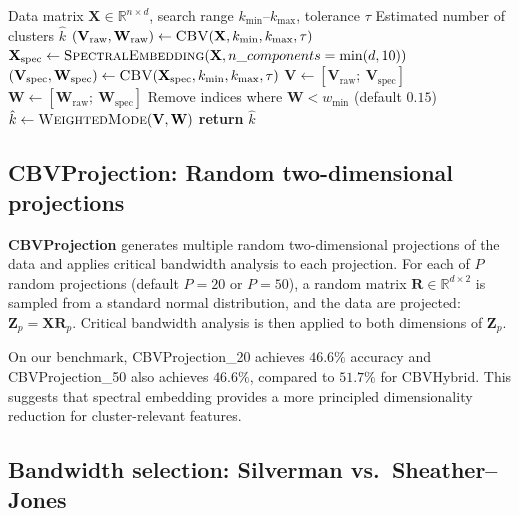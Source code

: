\documentclass[journal]{IEEEtran}
\begin{document}
\begin{algorithm}[t]
\caption{CBVHybrid Index}
\label{alg:cbvhybrid}
\begin{algorithmic}[1]
\Require Data matrix $\mathbf{X} \in \mathbb{R}^{n \times d}$, search range $k_{\min}$--$k_{\max}$, tolerance $\tau$
\Ensure Estimated number of clusters $\hat{k}$
\State $(\mathbf{V}_{\mathrm{raw}}, \mathbf{W}_{\mathrm{raw}}) \gets \textsc{CBV}(\mathbf{X}, k_{\min}, k_{\max}, \tau)$
\State $\mathbf{X}_{\mathrm{spec}} \gets \textsc{SpectralEmbedding}(\mathbf{X}, n\_components = \min(d, 10))$
\State $(\mathbf{V}_{\mathrm{spec}}, \mathbf{W}_{\mathrm{spec}}) \gets \textsc{CBV}(\mathbf{X}_{\mathrm{spec}}, k_{\min}, k_{\max}, \tau)$
\State $\mathbf{V} \gets [\mathbf{V}_{\mathrm{raw}};\ \mathbf{V}_{\mathrm{spec}}]$
\State $\mathbf{W} \gets [\mathbf{W}_{\mathrm{raw}};\ \mathbf{W}_{\mathrm{spec}}]$
\State Remove indices where $\mathbf{W} < w_{\min}$ (default $0.15$)
\State $\hat{k} \gets \textsc{WeightedMode}(\mathbf{V}, \mathbf{W})$
\State \textbf{return} $\hat{k}$
\end{algorithmic}
\end{algorithm}

\subsection{CBVProjection: Random two-dimensional projections}
\label{sec:cbvprojection}

\textbf{CBVProjection} generates multiple random two-dimensional projections of the data and applies critical bandwidth analysis to each projection. For each of $P$ random projections (default $P = 20$ or $P = 50$), a random matrix $\mathbf{R} \in \mathbb{R}^{d \times 2}$ is sampled from a standard normal distribution, and the data are projected: $\mathbf{Z}_p = \mathbf{X} \mathbf{R}_p$. Critical bandwidth analysis is then applied to both dimensions of $\mathbf{Z}_p$.

On our benchmark, CBVProjection\_20 achieves $46.6\%$ accuracy and CBVProjection\_50 also achieves $46.6\%$, compared to $51.7\%$ for CBVHybrid. This suggests that spectral embedding provides a more principled dimensionality reduction for cluster-relevant features.

\subsection{Bandwidth selection: Silverman vs.\ Sheather--Jones}
\label{sec:bandwidth-selection}
\end{document}
